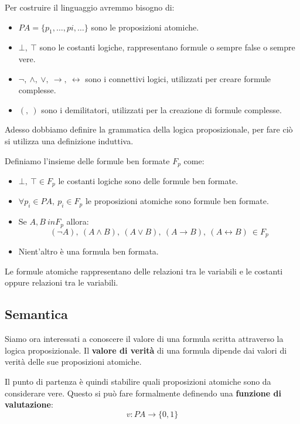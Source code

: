 Per costruire il linguaggio avremmo bisogno di:
\begin{itemize}
    \item $PA = \{p_1, \dots, pi, \dots\}$ sono le proposizioni atomiche.
    \item $\bot, \ \top$ sono le costanti logiche, rappresentano formule o sempre false o sempre vere.
    \item $\lnot, \ \land, \ \lor, \ \to, \ \leftrightarrow$ sono i connettivi logici, utilizzati per creare formule complesse.
    \item $(, \ )$ sono i demilitatori, utilizzati per la creazione di formule complesse.
\end{itemize}
Adesso dobbiamo definire la grammatica della logica proposizionale, per fare ciò si utilizza una definizione induttiva.
\begin{definizione}
    Definiamo l'insieme delle formule ben formate $F_p$ come:
    \begin{itemize}
        \item $\bot, \ \top \in F_p$ le costanti logiche sono delle formule ben formate.
        \item $\forall p_i \in PA, \ p_i \in F_p$ le proposizioni atomiche sono formule ben formate.
        \item Se $A, B \ in F_p$ allora:
        \begin{equation}
            (\lnot A), \ (A \land B), \ (A \lor B), \ (A \to B), \ (A \leftrightarrow B) \ \in F_p
        \end{equation}
        \item Nient'altro è una formula ben formata.
    \end{itemize}
\end{definizione}
Le formule atomiche rappresentano delle relazioni tra le variabili e le costanti oppure relazioni tra le variabili.
\subsection{Semantica}
Siamo ora interessati a conoscere il valore di una formula scritta attraverso la logica proposizionale. Il \textbf{valore di verità} di una formula dipende dai valori di verità delle sue proposizioni atomiche.

Il punto di partenza è quindi stabilire quali proposizioni atomiche sono da considerare vere. Questo si può fare formalmente definendo una \textbf{funzione di valutazione}:
\begin{equation}
    v: PA \to \{0, 1\}
\end{equation}

